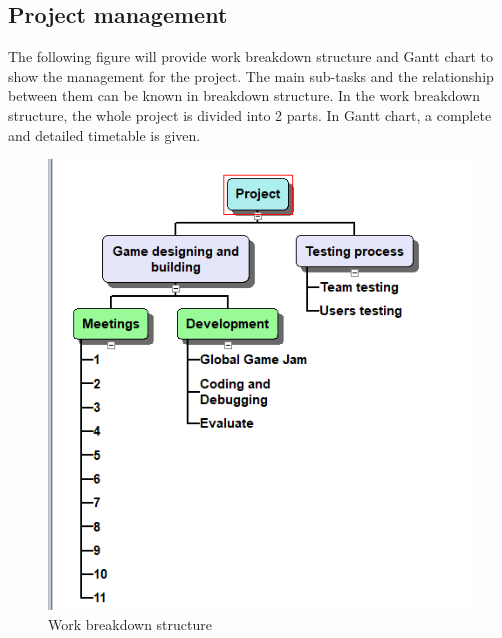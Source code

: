 \documentclass[12pt]{article}
\begin{document}
\subsection{Project management}

The following figure will provide work breakdown structure and Gantt chart to show the management for the  project. The main sub-tasks and the relationship between them can be known in breakdown structure. In the work breakdown structure, the whole project is divided into 2 parts. In Gantt chart, a complete and detailed timetable is given.

\begin{figure}[H]
    \centering
    \includegraphics{images/WBS.png}
    \caption{Work breakdown structure}
    \label{fig:wbs}
\end{figure}

\newpage

    



\newpage


\end{document}
